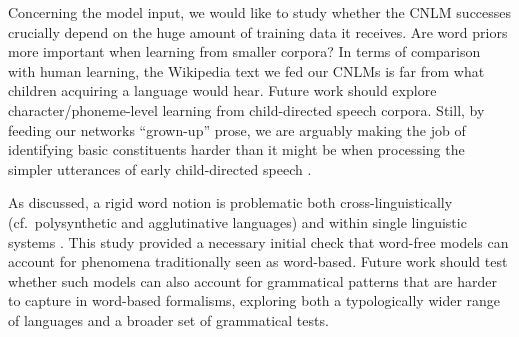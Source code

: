 Concerning the model input, we would like to study whether the
CNLM successes crucially depend on the huge amount
of training data it receives.  Are word priors more important when
learning from smaller corpora? In terms of comparison with human
learning, the Wikipedia text we fed our CNLMs is far from
what children acquiring a language would hear. Future work should
explore character/phoneme-level learning from child-directed speech
corpora. Still, by feeding our networks ``grown-up'' prose, we are
arguably making the job of identifying basic constituents harder than
it might be when processing the simpler utterances of early
child-directed speech \cite{Tomasello:2003}.

As discussed, a rigid word notion is problematic both
cross-linguistically (cf.~polysynthetic and agglutinative languages)
and within single linguistic systems \cite[cf.~the view that
the lexicon hosts units at different levels of the linguistic
hierarchy, from morphemes to large syntactic constructions,
e.g.,][]{Jackendoff:1997,Croft:Cruse:2004,Goldberg:2005}. This study provided a necessary initial check
that word-free models can account for phenomena traditionally
seen as word-based. Future work should test whether such models
 can also account for grammatical patterns that are harder to
capture in word-based formalisms, exploring both a typologically
wider range of languages and a broader set of grammatical tests.



